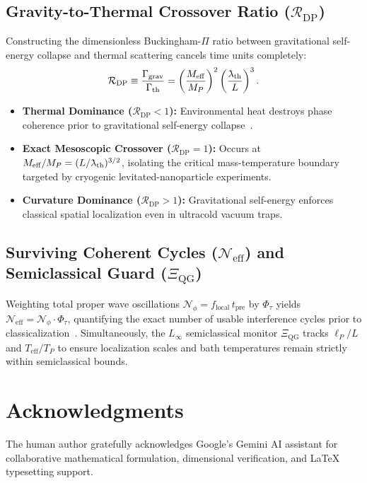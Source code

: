 \documentclass[11pt,a4paper]{article}
\newcommand{\lambdabar}{\mathchar'26\mkern-9mu\lambda}
\begin{document}
\subsection{Gravity-to-Thermal Crossover Ratio (\texorpdfstring{$\mathcal{R}_{\mathrm{DP}}$}{R\_DP})}
Constructing the dimensionless Buckingham-$\Pi$ ratio between gravitational self-energy collapse and thermal scattering cancels time units completely:
\begin{equation}
\mathcal{R}_{\mathrm{DP}} \equiv \frac{\Gamma_{\mathrm{grav}}}{\Gamma_{\mathrm{th}}} = \left(\frac{M_{\mathrm{eff}}}{M_P}\right)^2 \left(\frac{\lambdabar_{\mathrm{th}}}{L}\right)^3.
\end{equation}
\begin{itemize}
\item \textbf{Thermal Dominance ($\mathcal{R}_{\mathrm{DP}} < 1$):} Environmental heat destroys phase coherence prior to gravitational self-energy collapse~\cite{Zurek2003}.
\item \textbf{Exact Mesoscopic Crossover ($\mathcal{R}_{\mathrm{DP}} = 1$):} Occurs at $M_{\mathrm{eff}} / M_P = (L / \lambdabar_{\mathrm{th}})^{3/2}$, isolating the critical mass-temperature boundary targeted by cryogenic levitated-nanoparticle experiments.
\item \textbf{Curvature Dominance ($\mathcal{R}_{\mathrm{DP}} > 1$):} Gravitational self-energy enforces classical spatial localization even in ultracold vacuum traps.
\end{itemize}

\subsection{Surviving Coherent Cycles (\texorpdfstring{$\mathcal{N}_{\mathrm{eff}}$}{N\_eff}) and Semiclassical Guard (\texorpdfstring{$\Xi_{\mathrm{QG}}$}{Xi\_QG})}
Weighting total proper wave oscillations $\mathcal{N}_\phi = f_{\mathrm{local}}\,t_{\mathrm{pre}}$ by $\Phi_\tau$ yields $\mathcal{N}_{\mathrm{eff}} = \mathcal{N}_\phi \cdot \Phi_\tau$, quantifying the exact number of usable interference cycles prior to classicalization~\cite{Margolus1998}. Simultaneously, the $L_\infty$ semiclassical monitor $\Xi_{\mathrm{QG}}$ tracks $\ell_P / L$ and $T_{\mathrm{eff}} / T_P$ to ensure localization scales and bath temperatures remain strictly within semiclassical bounds.

\section*{Acknowledgments}
The human author gratefully acknowledges Google's Gemini AI assistant for collaborative mathematical formulation, dimensional verification, and \LaTeX{} typesetting support.
\end{document}
